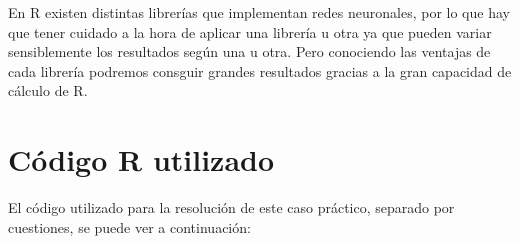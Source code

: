 \documentclass[12pt,a4paper,twoside,openright,titlepage,final]{article}
\begin{document}
En R existen distintas librerías que implementan redes neuronales, por lo que hay que tener cuidado a la hora de aplicar una librería u otra ya que pueden variar sensiblemente los resultados según una u otra. Pero conociendo las ventajas de cada librería podremos consguir grandes resultados gracias a la gran capacidad de cálculo de R.

\clearpage

\section{Código R utilizado}

El código utilizado para la resolución de este caso práctico, separado por cuestiones, se puede ver a continuación:\\


 
\end{document}
